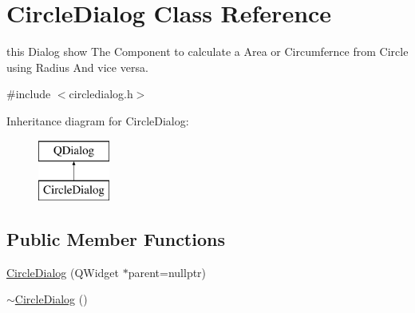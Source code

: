 \hypertarget{class_circle_dialog}{}\section{Circle\+Dialog Class Reference}
\label{class_circle_dialog}


this Dialog show The Component to calculate a Area or Circumfernce from Circle using Radius And vice versa.  




{\ttfamily \#include $<$circledialog.\+h$>$}

Inheritance diagram for Circle\+Dialog\+:\begin{figure}[H]
\begin{center}
\leavevmode
\includegraphics[height=2.000000cm]{class_circle_dialog}
\end{center}
\end{figure}
\subsection*{Public Member Functions}
\begin{DoxyCompactItemize}
\item 
\mbox{\hyperlink{class_circle_dialog_a2ecf57d02624a8b71b87b4c6932b31e7}{Circle\+Dialog}} (Q\+Widget $\ast$parent=nullptr)
\item 
\mbox{\hyperlink{class_circle_dialog_af6f4fa50cf7f1f797060639189a18382}{$\sim$\+Circle\+Dialog}} ()
\end{DoxyCompactItemize}
